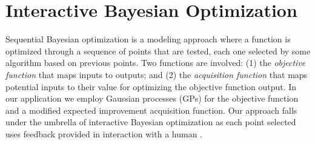 \documentclass[letterpaper]{article}
\begin{document}





\section{Interactive Bayesian Optimization}
Sequential Bayesian optimization is a modeling approach where a function is optimized through a sequence of points that are tested, each one selected by some algorithm based on previous points. Two functions are involved: (1) the \textit{objective function} that maps inputs to outputs; and (2) the \textit{acquisition function} that maps potential inputs to their value for optimizing the objective function output. In our application we employ Gaussian processes (GPs) for the objective function and a modified expected improvement acquisition function. Our approach falls under the umbrella of interactive Bayesian optimization as each point selected uses feedback provided in interaction with a human \cite{brochu2010:thesis}.
\end{document}
